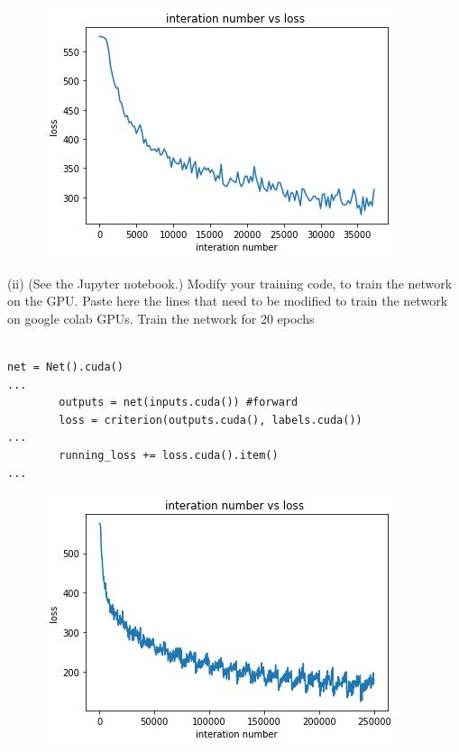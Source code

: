 \documentclass[answers]{exam}
\begin{document}
\begin{solution}
\begin{figure}[H]
    \centering
    \includegraphics[width=0.9\linewidth]{Images/cpu.png}
\end{figure}
\end{solution}

(ii) (See the Jupyter notebook.) Modify your training code, to train the network on the GPU. Paste here the lines that need to be modified to train the network on google colab GPUs. Train the network for 20 epochs
\begin{solution}
\begin{verbatim}

net = Net().cuda()
...
        outputs = net(inputs.cuda()) #forward
        loss = criterion(outputs.cuda(), labels.cuda())
...
        running_loss += loss.cuda().item()
...
\end{verbatim}
\begin{figure}[H]
    \centering
    \includegraphics[width=0.9\linewidth]{Images/gpu.png}
\end{figure}
\end{solution}
\end{document}

